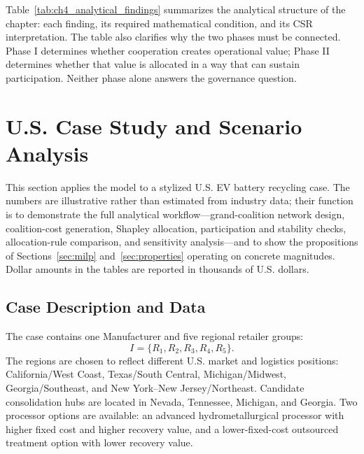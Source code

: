 Table~\ref{tab:ch4_analytical_findings} summarizes the analytical structure of the chapter: each finding, its required mathematical condition, and its CSR interpretation. The table also clarifies why the two phases must be connected. Phase I determines whether cooperation creates operational value; Phase II determines whether that value is allocated in a way that can sustain participation. Neither phase alone answers the governance question.

\section{U.S. Case Study and Scenario Analysis}
\label{sec:case_study}

This section applies the model to a stylized U.S. EV battery recycling case. The numbers are illustrative rather than estimated from industry data; their function is to demonstrate the full analytical workflow---grand-coalition network design, coalition-cost generation, Shapley allocation, participation and stability checks, allocation-rule comparison, and sensitivity analysis---and to show the propositions of Sections~\ref{sec:milp} and~\ref{sec:properties} operating on concrete magnitudes. Dollar amounts in the tables are reported in thousands of U.S. dollars.

\subsection{Case Description and Data}

The case contains one Manufacturer and five regional retailer groups:
\begin{equation*}
I=\{R_1,R_2,R_3,R_4,R_5\}.
\end{equation*}
The regions are chosen to reflect different U.S. market and logistics positions: California/West Coast, Texas/South Central, Michigan/Midwest, Georgia/Southeast, and New York--New Jersey/Northeast. Candidate consolidation hubs are located in Nevada, Tennessee, Michigan, and Georgia. Two processor options are available: an advanced hydrometallurgical processor with higher fixed cost and higher recovery value, and a lower-fixed-cost outsourced treatment option with lower recovery value.

